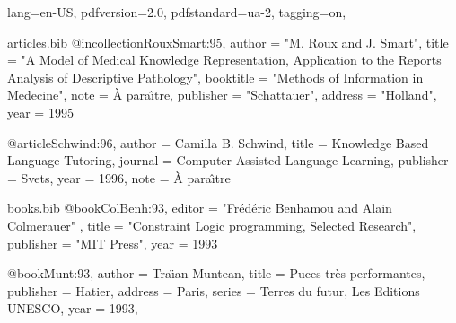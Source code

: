 \ifdefined\Uchar\RequirePackage{luatagging}\fi
\DocumentMetadata
  {
    lang=en-US,
    pdfversion=2.0,
    pdfstandard=ua-2,
    tagging=on,
  }
\begin{filecontents}{articles.bib}
@incollection{RouxSmart:95,
    author    = "M. Roux and J. Smart",
    title     = "A Model of Medical Knowledge Representation, Application
                 to the Reports Analysis of Descriptive Pathology",
    booktitle = "Methods of Information in Medecine",
    note      = {\`A para\^{\i}tre},
    publisher = "Schattauer",
    address   = "Holland",
    year      = 1995
}

@article{Schwind:96,
    author    = {Camilla B. Schwind},
    title     = {Knowledge Based Language Tutoring},
    journal   = {Computer Assisted Language Learning},
    publisher = {Svets},
    year      = 1996,
    note      = {\`A para\^{\i}tre}
}
\end{filecontents}
\begin{filecontents}{books.bib}
@book{ColBenh:93,
   editor = "Fr\'ed\'eric Benhamou and Alain Colmerauer" ,
   title = "Constraint Logic programming, Selected Research",
   publisher = "MIT Press",
   year = 1993
}

@book{Munt:93,
   author =    {Tra{\"\i}an Muntean},
   title =     {Puces tr\`es performantes},
   publisher = {Hatier},
   address =   {Paris},
   series = {Terres du futur, Les Editions UNESCO},
   year =      1993,
}
\end{filecontents}

\documentclass[10pt]{article}
\usepackage{bibtopic}
\usepackage{hyperref}



\section{Testing}
Let's cite all the books: \cite{ColBenh:93} and
\cite{Munt:93}; and an article: \cite{RouxSmart:95}.

\begin{btSect}{books}
\section{References from books}
\btPrintCited
\end{btSect}

\begin{btSect}[plain]{articles}
\section{References from articles}
\btPrintCited

\section{Articles not cited}
\btPrintNotCited
\end{btSect}
